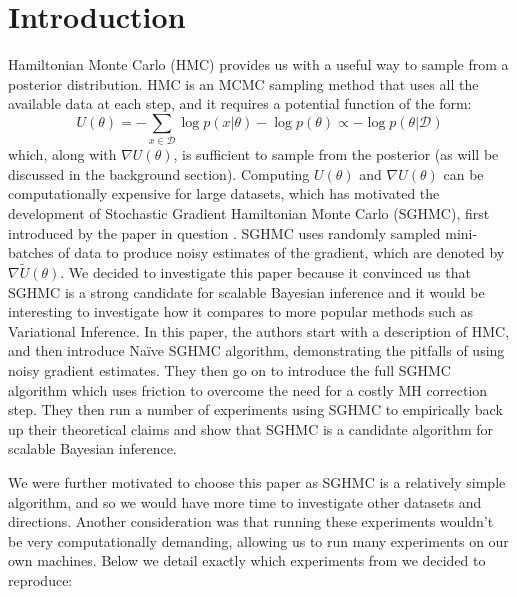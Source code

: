 
\section{Introduction}

Hamiltonian Monte Carlo (HMC) provides us with a useful way to sample from a posterior distribution. HMC is an MCMC sampling method that uses all the available data at each step, and it requires a potential function of the form:
\begin{equation*}
    U(\theta) = - \sum_{x\in\mathcal{D}}\log p(x| \theta) - \log p(\theta ) \propto -\log p(\theta | \mathcal{D})
\end{equation*}
which, along with $\nabla U(\theta)$, is sufficient to sample from the posterior (as will be discussed in the background section). Computing $U(\theta)$ and $\nabla U(\theta)$ can be computationally expensive for large datasets, which has motivated the development of Stochastic Gradient Hamiltonian Monte Carlo (SGHMC), first introduced by the paper in question \cite{sghmc}. SGHMC uses randomly sampled mini-batches of data to produce noisy estimates of the gradient, which are denoted by $\nabla \widetilde U(\theta)$. We decided to investigate this paper because it convinced us that SGHMC is a strong candidate for scalable Bayesian inference and it would be interesting to investigate how it compares to more popular methods such as Variational Inference. In this paper, the authors start with a description of HMC, and then introduce Naïve SGHMC algorithm, demonstrating the pitfalls of using noisy gradient estimates. They then go on to introduce the full SGHMC algorithm which uses friction to overcome the need for a costly MH correction step. They then run a number of experiments using SGHMC to empirically back up their theoretical claims and show that SGHMC is a candidate algorithm for scalable Bayesian inference.

We were further motivated to choose this paper as SGHMC is a relatively simple algorithm, and so we would have more time to investigate other datasets and directions.  Another consideration was that running these experiments wouldn't be very computationally demanding, allowing us to run many experiments on our own machines. Below we detail exactly which experiments from \cite{sghmc} we decided to reproduce:

